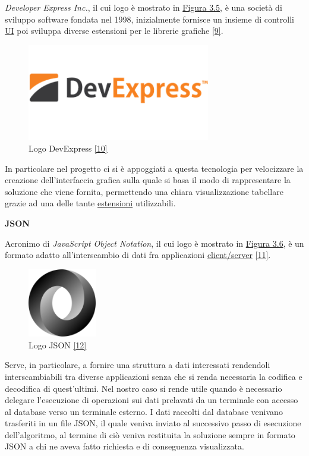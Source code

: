 \textit{Developer Express Inc.}, il cui logo è mostrato in \hyperref[dev-exp]{Figura 3.5}, è una società di sviluppo software fondata nel 1998, inizialmente fornisce un insieme di controlli 
\hyperref[UI]{UI\glo} poi sviluppa diverse estensioni per le librerie grafiche \hyperref[devexpress]{[9]}.

\begin{figure}[H]
	\includegraphics[width=8cm]{immagini/devexpress.png}
	\centering
	\caption{Logo DevExpress \hyperref[devlogo]{[10]}}
	\label{dev-exp}
\end{figure}

In particolare nel progetto ci si è appoggiati a questa tecnologia per velocizzare la creazione dell'interfaccia grafica sulla quale si basa il modo di rappresentare la soluzione
che viene fornita, permettendo una chiara visualizzazione tabellare grazie ad una delle tante \hyperref[Estensioni]{estensioni\glo} utilizzabili. 

\newpage

\textbf{JSON}

Acronimo di \textit{JavaScript Object Notation}, il cui logo è mostrato in \hyperref[js]{Figura 3.6}, è un formato adatto
all'interscambio di dati fra applicazioni \hyperref[Client/Server]{client/server\glo} \hyperref[json]{[11]}.

\begin{figure}[H]
	\includegraphics[width=3cm]{immagini/json.png}
	\centering
	\caption{Logo JSON \hyperref[jlogo]{[12]}}
	\label{js}
\end{figure}

Serve, in particolare, a fornire una struttura a dati interessati rendendoli interscambiabili tra diverse applicazioni senza che si renda necessaria la codifica e decodifica di quest'ultimi.
Nel nostro caso si rende utile quando è necessario delegare l'esecuzione di operazioni sui dati prelavati da un terminale con accesso al database verso un terminale esterno.
I dati raccolti dal database venivano trasferiti in un file JSON, il quale veniva inviato al successivo passo di esecuzione dell'algoritmo, al termine di ciò veniva restituita
la soluzione sempre in formato JSON a chi ne aveva fatto richiesta e di conseguenza visualizzata.\\

